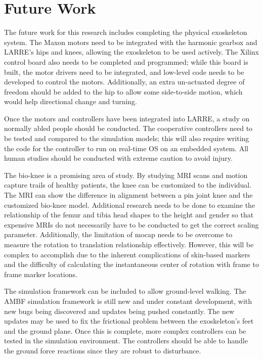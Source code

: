 \section{Future Work}

The future work for this research includes completing the physical exoskeleton system. The Maxon motors need to be integrated with the harmonic gearbox and LARRE's hips and knees, allowing the exoskeleton to be used actively. The Xilinx control board also needs to be completed and programmed; while this board is built, the motor drivers need to be integrated, and low-level code needs to be developed to control the motors. Additionally, an extra un-actuated degree of freedom should be added to the hip to allow some side-to-side motion, which would help directional change and turning. 

Once the motors and controllers have been integrated into LARRE, a study on normally abled people should be conducted. The cooperative controllers need to be tested and compared to the simulation models; this will also require writing the code for the controller to run on real-time OS on an embedded system. All human studies should be conducted with extreme caution to avoid injury. 

The bio-knee is a promising area of study. By studying MRI scans and motion capture trails of healthy patients, the knee can be customized to the individual. The MRI can show the difference in alignment between a pin joint knee and the customized bio-knee model. Additional research needs to be done to examine the relationship of the femur and tibia head shapes to the height and gender so that expensive MRIs do not necessarily have to be conducted to get the correct scaling parameter. Additionally, the limitation of mocap needs to be overcome to measure the rotation to translation relationship effectively. However, this will be complex to accomplish due to the inherent complications of skin-based markers and the difficulty of calculating the instantaneous center of rotation with frame to frame marker locations.  

The simulation framework can be included to allow ground-level walking. The AMBF simulation framework is still new and under constant development, with new bugs being discovered and updates being pushed constantly. The new updates may be used to fix the frictional problem between the exoskeleton's feet and the ground plane. Once this is complete, more complex controllers can be tested in the simulation environment. The controllers should be able to handle the ground force reactions since they are robust to disturbance. 


